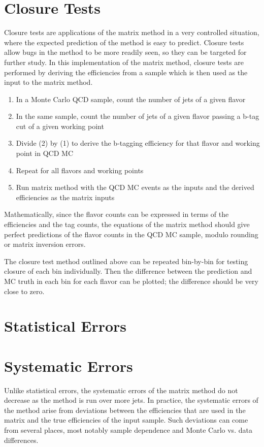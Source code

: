 \section{Closure Tests}
Closure tests are applications of the matrix method in a very controlled situation, where the expected prediction of the method is easy to predict.  Closure tests allow bugs in the method to be more readily seen, so they can be targeted for further study.  In this implementation of the matrix method, closure tests are performed by deriving the efficiencies from a sample which is then used as the input to the matrix method.  

\begin{enumerate}
	\item In a Monte Carlo QCD sample, count the number of jets of a given flavor
	\item In the same sample, count the number of jets of a given flavor passing a b-tag cut of a given working point 
	\item Divide (2) by (1) to derive the b-tagging efficiency for that flavor and working point in QCD MC
	\item Repeat for all flavors and working points
	\item Run matrix method with the QCD MC events as the inputs and the derived efficiencies as the matrix inputs
\end{enumerate}

Mathematically, since the flavor counts can be expressed in terms of the efficiencies and the tag counts, the equations of the matrix method should give perfect predictions of the flavor counts in the QCD MC sample, modulo rounding or matrix inversion errors.  

The closure test method outlined above can be repeated bin-by-bin for testing closure of each bin individually.  Then the difference between the prediction and MC truth in each bin for each flavor can be plotted; the difference should be very close to zero.

\section{Statistical Errors}



\section{Systematic Errors}
Unlike statistical errors, the systematic errors of the matrix method do not decrease as the method is run over more jets.  In practice, the systematic errors of the method arise from deviations between the efficiencies that are used in the matrix and the true efficiencies of the input sample.  Such deviations can come from several places, most notably sample dependence and Monte Carlo vs. data differences. 

